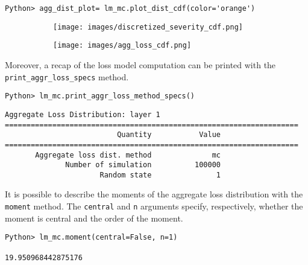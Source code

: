\documentclass{article}
\begin{document}
\begin{lstlisting}
Python> agg_dist_plot= lm_mc.plot_dist_cdf(color='orange')
\end{lstlisting}

\begin{figure}
\centering
\caption{Illustration of the discretized severity and the aggregate loss pertaining to a loss model with Poisson frequency ($\text{\texttt{mu}}=4$) and Gamma severity ($\text{\texttt{a}}=5$). Plot (a) shows the cdf of the discretized severity, assuming $d=0, c= 50$. Plot (b) displays the aggregate loss cdf. No aggregate coverage modifiers are present.}
\begin{subfigure}[b]{0.45\textwidth}
    \centering\texttt{[image: images/discretized\_severity\_cdf.png]}
    \caption{}
    \label{fig:discreteseverity}
\end{subfigure}
\hfill
\begin{subfigure}[b]{0.45\textwidth}
    \centering\texttt{[image: images/agg\_loss\_cdf.png]}
    \caption{}
    \label{fig:aggrloss}
\end{subfigure}

\end{figure}


Moreover, a recap of the loss model computation can be printed with the \texttt{print\_aggr\_loss\_specs} method.

\begin{lstlisting}
Python> lm_mc.print_aggr_loss_method_specs()
\end{lstlisting}

\begin{lstlisting}
Aggregate Loss Distribution: layer 1 
====================================================================
                          Quantity           Value 
====================================================================
       Aggregate loss dist. method              mc
              Number of simulation          100000
                      Random state               1
\end{lstlisting}

It is possible to describe the moments of the aggregate loss distribution with the \texttt{moment} method. The \texttt{central} and \texttt{n} arguments specify, respectively, whether the moment is central and the order of the moment. 

\begin{lstlisting}
Python> lm_mc.moment(central=False, n=1)

19.950968442875176
\end{lstlisting}
\end{document}
